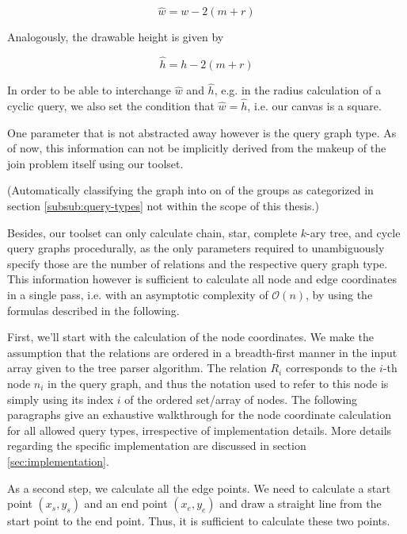 \begin{equation}\label{eqn:painting-w_hat}
    \hat{w} = w - 2(m + r)
\end{equation}

Analogously, the drawable height is given by

\begin{equation}\label{eqn:painting-h_hat}
    \hat{h} = h - 2(m + r)    
\end{equation}

In order to be able to interchange $\hat{w}$ and $\hat{h}$, e.g. in the radius calculation of a cyclic query, we also set the condition that $\hat{w} = \hat{h}$, i.e. our canvas is a square.

One parameter that is not abstracted away however is the query graph type. As of now, this information can not be implicitly derived from the makeup of the join problem itself using our toolset. 

(Automatically classifying the graph into on of the groups as categorized in section \ref{subsub:query-types}
not within the scope of this thesis.)

Besides, our toolset can only calculate chain, star, complete $k$-ary tree, and cycle query graphs procedurally, as the only parameters required to unambiguously specify those are the number of relations and the respective query graph type. This information however is sufficient to calculate all node and edge coordinates in a single pass, i.e. with an asymptotic complexity of $\mathcal{O}(n)$, by using the formulas described in the following.


First, we'll start with the calculation of the node coordinates. We make the assumption that the relations are ordered in a breadth-first manner in the input array given to the tree parser algorithm. The relation $R_i$ corresponds to the $i$-th node $n_i$ in the query graph, and thus the notation used to refer to this node is simply using its index $i$ of the ordered set/array of nodes. The following paragraphs give an exhaustive walkthrough for the node coordinate calculation for all allowed query types, irrespective of implementation details. More details regarding the specific implementation are discussed in section \ref{sec:implementation}.

As a second step, we calculate all the edge points. We need to calculate a start point $(x_s, y_s)$ and an end point $(x_e, y_e)$ and draw a straight line from the start point to the end point. Thus, it is sufficient to calculate these two points.

